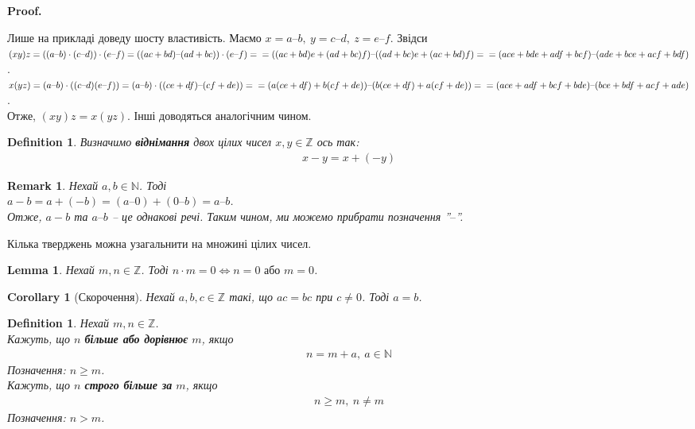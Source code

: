 \documentclass[a4paper, 14pt]{extarticle}
\makeatletter
\theoremstyle{theoremdd}
\theoremstyle{theoremdd}
\newtheorem{definition}[theorem]{Definition}
\theoremstyle{theoremdd}
\theoremstyle{theoremdd}
\theoremstyle{theoremdd}
\theoremstyle{theoremdd}
\theoremstyle{theoremdd}
\theoremstyle{theoremdd}
\theoremstyle{theoremdd}
\theoremstyle{theoremdd}
\theoremstyle{theoremdd}
\theoremstyle{theoremdd}
\newtheorem{remark}[theorem]{Remark}
\theoremstyle{theoremdd}
\theoremstyle{theoremdd}
\newtheorem{lemma}[theorem]{Lemma}
\theoremstyle{theoremdd}
\newtheorem{corollary}[theorem]{Corollary}
\theoremstyle{theoremdd}
\renewenvironment{proof}[1][Proof.\\]{\par
\pushQED{\hfill \qed}%
\normalfont \topsep6\p@\@plus6\p@\relax
\trivlist
\item\relax
{\bfseries
#1\@addpunct{.}}\hspace\labelsep\ignorespaces
}{%
\popQED\endtrivlist\@endpefalse
}
\newcommand{\subtract}{\text{--}}
\makeatother
\begin{document}
\begin{proof}
Лише на прикладі доведу шосту властивість. Маємо $x = a \subtract b,\ y = c \subtract d,\ z = e \subtract f$. Звідси\\
$(xy)z = ((a \subtract b) \cdot (c \subtract d)) \cdot (e \subtract f) = ((ac+bd) \subtract (ad + bc)) \cdot (e \subtract f) = \\
= ((ac+bd)e + (ad+bc)f) \subtract ((ad+bc)e + (ac+bd)f) = \\
= (ace + bde + adf + bcf) \subtract (ade + bce + acf + bdf)$.\\
$x(yz) = (a \subtract b) \cdot ((c \subtract d)(e \subtract f)) = (a \subtract b) \cdot ((ce + df) \subtract (cf + de)) = \\
= (a(ce+df) + b(cf+de)) \subtract (b(ce+df) + a(cf+de)) = \\
= (ace + adf + bcf + bde) \subtract (bce + bdf + acf + ade)$.\\
Отже, $(xy)z = x(yz)$. Інші доводяться аналогічним чином.
\end{proof}

\begin{definition}
Визначимо \textbf{віднімання} двох цілих чисел $x,y \in \mathbb{Z}$ ось так:
\begin{align*}
x-y = x + (-y)
\end{align*}
\end{definition}

\begin{remark}
Нехай $a,b \in \mathbb{N}$. Тоді\\
$a - b = a + (-b) = (a\subtract 0) + (0 \subtract b) = a \subtract b$.\\
Отже, $a - b$ та $a \subtract b$ -- це однакові речі. Таким чином, ми можемо прибрати позначення ''$\subtract$''.
\end{remark}

Кілька тверджень можна узагальнити на множині цілих чисел.

\begin{lemma}
Нехай $m,n \in \mathbb{Z}$. Тоді $n \cdot m = 0 \iff n = 0 \text{ або } m = 0$. 
\end{lemma}

\begin{corollary}[Скорочення]
Нехай $a,b,c \in \mathbb{Z}$ такі, що $ac = bc$ при $c \neq 0$. Тоді $a = b$.
\end{corollary}

\begin{definition}
Нехай $m,n \in \mathbb{Z}$.\\
Кажуть, що $n$ \textbf{більше або дорівнює} $m$, якщо \begin{align*}
n = m + a,\ a \in \mathbb{N}
\end{align*}
Позначення: $n \geq m$.\\
Кажуть, що $n$ \textbf{строго більше за} $m$, якщо
\begin{align*}
n \geq m,\ n \neq m
\end{align*}
Позначення: $n > m$.
\end{definition}
\end{document}
